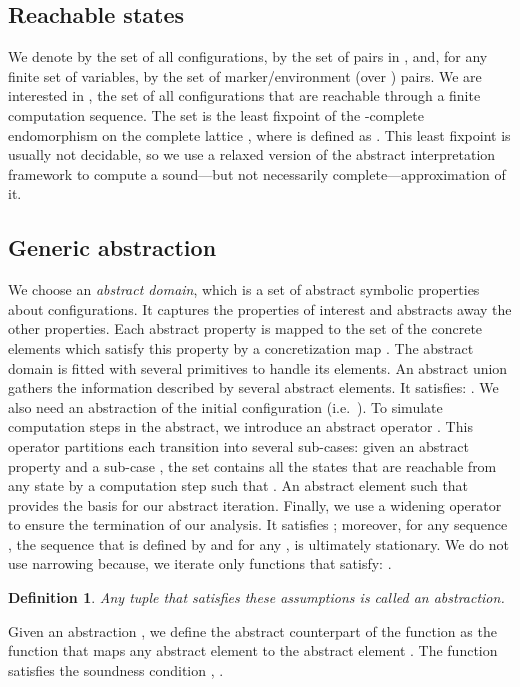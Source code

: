 \documentclass{article}
\newtheorem{definition}[thm]{Definition}
\begin{document}
\subsection{Reachable states}
We denote  by  the set  of all configurations, by  the set of pairs 
in , and, for any finite set  of variables, by  the set of  marker/environment (over ) pairs.
We are interested in , the set  of all configurations that are reachable through a finite computation sequence.
The set  is the least fixpoint of the -complete endomorphism  on the complete lattice , where  is defined as .
This least fixpoint is usually not decidable, so 
 we use a relaxed version of the abstract interpretation framework
\cite{cc:frameworks}  to compute a sound---but not necessarily complete---approximation of it.





\subsection{Generic abstraction}
We choose an \emph{abstract domain}, which is  a set of abstract symbolic properties about configurations.
It captures  the properties of interest and abstracts away the other properties. Each abstract property is mapped to the set of the concrete elements which satisfy this property by a  concretization map . The abstract domain is fitted with several primitives to handle its elements. 
An abstract union  gathers the information described by several abstract elements. It satisfies: . 
We also need an abstraction  of the initial configuration (i.e.~).
To simulate computation steps in the abstract, we introduce an abstract operator .  
This operator partitions each transition into several sub-cases: given an abstract property  and a sub-case , the set  contains all the states  that are reachable from any state  by a computation step  such that .
An abstract element  such that   provides the basis for our abstract iteration. Finally, we use a widening operator  to ensure the termination of our analysis. It satisfies ; moreover,  
for any sequence , the sequence  that is defined by  and  for any , is ultimately  stationary.
We do not use narrowing because, we iterate only functions  that satisfy: 
.
\begin{definition}
Any tuple  that satisfies these assumptions is called an abstraction.\end{definition}

Given an abstraction , we define the abstract counterpart  of the function 
 as the function that maps any abstract element  to the abstract element .
The function  satisfies the soundness condition , . 
\end{document}
